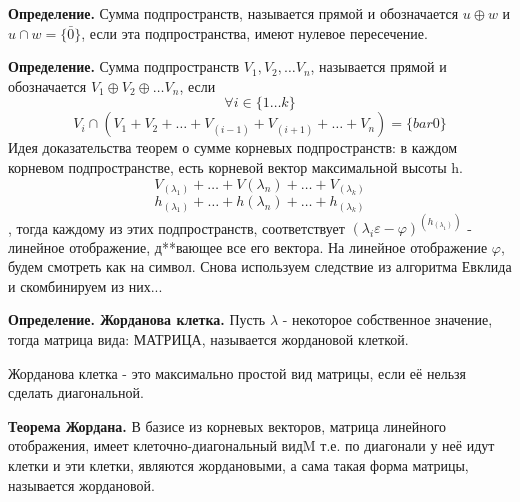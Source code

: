 \documentclass{article}
\begin{document}
{\bf Определение.} Сумма подпространств, называется прямой и обозначается $u\oplus w$ и $u\cap w=\{\bar{0}\}$, если эта подпространства, имеют нулевое пересечение.

{\bf Определение.} Сумма подпространств $V_1, V_2, \ldots V_n$, называется прямой и обозначается $V_1\oplus V_2\oplus\ldots V_n$, если $$\forall i \in \{1\ldots k\}$$
$$V_i \cap(V_1+V_2+\ldots+V_(i-1)+V_(i+1)+\ldots+V_n)=\{bar{0}\}$$
Идея доказательства теорем о сумме корневых подпространств: в каждом корневом подпространстве, есть корневой вектор максимальной высоты h.
$$V_(\lambda_1)+\ldots+V(\lambda_n)+\ldots+V_(\lambda_k)$$
$$h_(\lambda_1)+\ldots+h(\lambda_n)+\ldots+h_(\lambda_k)$$, тогда каждому из этих подпространств, соответствует $(\lambda_i\varepsilon-\varphi)^(h_(\lambda_1))$ - линейное отображение, д**вающее все его вектора. На линейное отображение $\varphi$, будем смотреть как на символ. Снова используем следствие из алгоритма Евклида и скомбинируем из них...

{\bf Определение. Жорданова клетка.} Пусть $\lambda$ - некоторое собственное значение, тогда матрица вида: МАТРИЦА, называется жордановой клеткой.

Жорданова клетка - это максимально простой вид матрицы, если её нельзя сделать диагональной.

{\bf Теорема Жордана.} В базисе из корневых векторов, матрица линейного отображения, имеет клеточно-диагональный видM т.е. по диагонали у неё идут клетки и эти клетки, являются жордановыми, а сама такая форма матрицы, называется жордановой.
\end{document}
